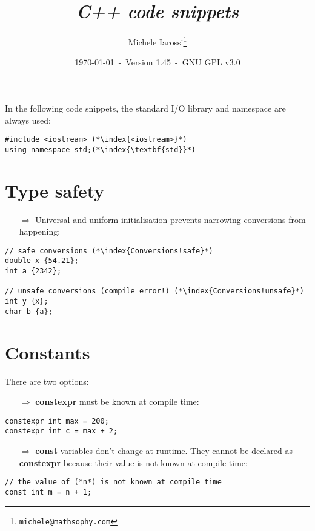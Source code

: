 \documentclass[10pt]{article}
\begin{document}
\title{\emph{C++ code snippets}}
\author{Michele Iarossi\thanks{\texttt{michele@mathsophy.com}}}
\date{\small \today~-~Version 1.45~-~GNU GPL v3.0}


\maketitle

\small

\begin{frame}{}
\setlength\columnsep{1cm}
\begin{multicols}{2}
\tableofcontents
\end{multicols}
\end{frame}

\noindent
In the following code snippets, the standard I/O library and namespace are always used:
\begin{lstlisting}
#include <iostream> (*\index{<iostream>}*)
using namespace std;(*\index{\textbf{std}}*) 
\end{lstlisting}

\newpage
%
%
\section{Type safety}
\small
\begin{enumerate}
\item[$\Rightarrow$] Universal and uniform initialisation prevents narrowing conversions from happening:
\end{enumerate}
\begin{lstlisting}
// safe conversions (*\index{Conversions!safe}*)
double x {54.21};
int a {2342};

// unsafe conversions (compile error!) (*\index{Conversions!unsafe}*)
int y {x};
char b {a};
\end{lstlisting}
%
%
\section{Constants}
\small
There are two options:
\begin{enumerate}
\item[$\Rightarrow$] \textbf{constexpr} must be known at compile time:
\end{enumerate}
\begin{lstlisting}
constexpr int max = 200;
constexpr int c = max + 2;
\end{lstlisting}
\begin{enumerate}
\item[$\Rightarrow$] \textbf{const} variables don't change at runtime. They cannot be declared as
\textbf{constexpr} because their value is not known at compile time:
\end{enumerate}
\begin{lstlisting}
// the value of (*n*) is not known at compile time
const int m = n + 1;
\end{lstlisting}
%
%
\end{document}
